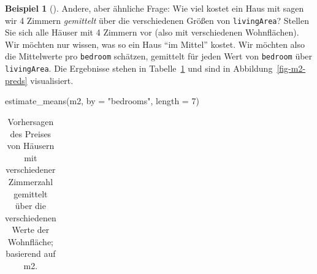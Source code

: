 \documentclass[
  ngerman,
  letterpaper,
  twoside,
  open=any]{scrbook}
\newenvironment{Shaded}{\begin{snugshade}}{\end{snugshade}}
\newcommand{\AttributeTok}[1]{\textcolor[rgb]{0.40,0.45,0.13}{#1}}
\newcommand{\DecValTok}[1]{\textcolor[rgb]{0.68,0.00,0.00}{#1}}
\newcommand{\FunctionTok}[1]{\textcolor[rgb]{0.28,0.35,0.67}{#1}}
\newcommand{\NormalTok}[1]{\textcolor[rgb]{0.00,0.23,0.31}{#1}}
\newcommand{\StringTok}[1]{\textcolor[rgb]{0.13,0.47,0.30}{#1}}
\theoremstyle{definition}
\newtheorem{example}{Beispiel}[chapter]
\theoremstyle{plain}
\theoremstyle{definition}
\theoremstyle{definition}
\theoremstyle{remark}
\begin{document}
\begin{example}[]
{}

Andere, aber ähnliche Frage: Wie viel kostet ein Haus mit sagen wir 4
Zimmern \emph{gemittelt} über die verschiedenen Größen von
\texttt{livingArea}? Stellen Sie sich alle Häuser mit 4 Zimmern vor
(also mit verschiedenen Wohnflächen). Wir möchten nur wissen, was so ein
Haus \enquote{im Mittel} kostet. Wir möchten also die Mittelwerte pro
\texttt{bedroom} schätzen, gemittelt für jeden Wert von \texttt{bedroom}
über \texttt{livingArea}. Die Ergebnisse stehen in
Tabelle~\ref{tbl-m2-estimate-pred2} und sind in
Abbildung~\ref{fig-m2-preds} visualisiert.

\begin{Shaded}
\begin{Highlighting}[]
\FunctionTok{estimate\_means}\NormalTok{(m2, }\AttributeTok{by =} \StringTok{"bedrooms"}\NormalTok{, }\AttributeTok{length =} \DecValTok{7}\NormalTok{)}
\end{Highlighting}
\end{Shaded}

{

\begin{longtable}[]{@{}
  >{\raggedleft\arraybackslash}p{}
  >{\raggedleft\arraybackslash}p{}
  >{\raggedleft\arraybackslash}p{}
  >{\raggedleft\arraybackslash}p{}
  >{\raggedleft\arraybackslash}p{}
  >{\raggedleft\arraybackslash}p{}
  >{\raggedleft\arraybackslash}p{}
  >{\raggedleft\arraybackslash}p{}
  >{\raggedleft\arraybackslash}p{}@{}}

\caption{\label{tbl-m2-estimate-pred2}Vorhersagen des Preises von
Häusern mit verschiedener Zimmerzahl gemittelt über die verschiedenen
Werte der Wohnfläche; basierend auf m2.}

\tabularnewline


\end{longtable}}
\end{example}
\end{document}
